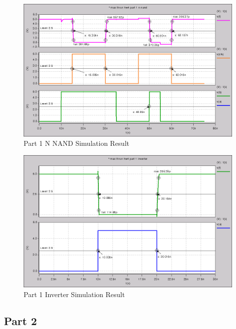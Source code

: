 \documentclass{article}
\begin{document}
\begin{figure}[H]
    \centering
    \includegraphics[width=\linewidth]{../part_1_n_nand.png}
    \caption{Part 1 N NAND Simulation Result}
\end{figure}

\begin{figure}[H]
    \centering
    \includegraphics[width=\linewidth]{../part_1_inv.png}
    \caption{Part 1 Inverter Simulation Result}
\end{figure}

\newpage
\subsection*{Part 2}


\end{document}
